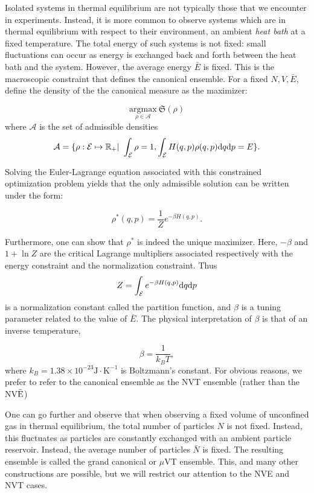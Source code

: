 \begin{example}
    Isolated systems in thermal equilibrium are not typically those that we encounter in experiments. Instead, it is more common to observe systems which are in thermal equilibrium with respect to their environment, an ambient \textit{heat bath} at a fixed temperature.
    The total energy of such systems is not fixed: small fluctuations can occur as energy is exchanged back and forth between the heat bath and the system. However, the average energy $\bar E$ is fixed. 
    This is the macroscopic constraint that defines the canonical ensemble. For a fixed $N,V,\bar E$, define the density of the the canonical measure as the maximizer:

    $$ \underset{\rho \in \mathcal A}{\mathrm{argmax}}\ \mathfrak S(\rho)$$
    where $\mathcal A$ is the set of admissible densities
    $$\mathcal A=\{ \rho: \mathcal E \mapsto \mathbb{R}_+ |\ \int_{\mathcal E} \rho =1, \int_{\mathcal E} H(q,p)\rho(q,p)\text d q \text d p=E \}.$$

    Solving the Euler-Lagrange equation associated with this constrained optimization problem yields that the only admissible solution can be written under the form:

    $$ \rho^*(q,p)= \frac 1{Z} e^{-\beta H(q,p)}.$$

    Furthermore, one can show that $\rho^*$ is indeed the unique maximizer.
    Here, $-\beta$ and $1+\ln Z$ are the critical Lagrange multipliers associated respectively with the energy constraint and the normalization constraint. Thus
    $$Z=\int_{\mathcal E} e^{-\beta H(q,p)}\text d q \text d p$$
    is a normalization constant called the partition function, and $\beta$ is a tuning parameter related to the value of $\bar E$. The physical interpretation of $\beta$ is that of an inverse temperature,

    $$ \beta = \frac 1{k_B T},$$
    where $k_B=1.38 \times 10 ^{-23} \mathrm{J\cdot K^{-1}}$ is Boltzmann's constant. For obvious reasons, we prefer to refer to the canonical ensemble as the NVT ensemble (rather than the NV$\bar {\text E}$)
\end{example}

\begin{remark}
One can go further and observe that when observing a fixed volume of unconfined gas in thermal equilibrium, the total number of particles $N$ is not fixed. Instead, this fluctuates as particles are constantly exchanged with an ambient particle reservoir. Instead, the average number of particles $\bar N$ is fixed. The resulting ensemble is called the grand canonical or $\mu$VT ensemble. This, and many other constructions are possible, but we will restrict our attention to the NVE and NVT cases. 
\end{remark}

